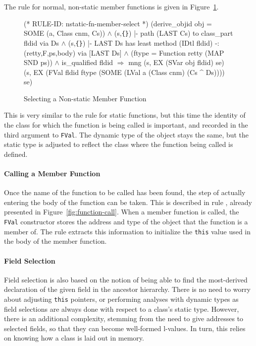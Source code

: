 \documentclass[11pt]{article}
\newcommand{\lbr}{\texttt{\{}}
\newcommand{\rbr}{\texttt{\}}}
\begin{document}
The rule for normal, non-static  member functions is given in
Figure~\ref{fig:nstatic-fn-member-select}.
\begin{figure}
%
\begin{stdrule}
(* RULE-ID: nstatic-fn-member-select *)
     (derive_objid obj = SOME (a, Class cnm, Cs)) \(\land\)
     (s,\lbr\rbr) |- path (LAST Cs) to class_part fldid via Ds \(\land\)
     (s,\lbr\rbr) |- LAST Ds has least method
                  (IDtl fldid) -: (retty,F,ps,body)
                  via [LAST Ds] \(\land\)
     (ftype = Function retty (MAP SND ps)) \(\land\)
     is_qualified fldid
   \(\Rightarrow\)
     mng (s, EX (SVar obj fldid) se)
         (s, EX (FVal fldid ftype
                      (SOME (LVal a (Class cnm) (Cs ^ Ds))))
                se)
\end{stdrule}
\caption{Selecting a Non-static Member Function}
\label{fig:nstatic-fn-member-select}
\end{figure}
This is very similar to the rule for static functions, but this time
the identity of the class for which the function is being called is
important, and recorded in the third argument to \texttt{FVal}.  The
dynamic type of the object stays the same, but the static type is
adjusted to reflect the class where the function being called is
defined.

\paragraph{Calling a Member Function}
Once the name of the function to be called has been found, the step of
actually entering the body of the function can be taken.  This is
described in rule , already presented in
Figure~\ref{fig:function-call}.%
%
When a member function is called, the \texttt{FVal} constructor stores
the address and type of the object that the function is a member of.
The rule extracts this information to initialize the \texttt{this}
value used in the body of the member function.

\paragraph{Field Selection}
Field selection is also based on the notion of being able to find the
most-derived declaration of the given field in the ancestor hierarchy.
There is no need to worry about adjusting \texttt{this} pointers, or
performing analyses with dynamic types as field selections are always
done with respect to a class's static type.  However, there is an
additional complexity, stemming from the need to give addresses to
selected fields, so that they can become well-formed l-values.  In
turn, this relies on knowing how a class is laid out in memory.
\end{document}
